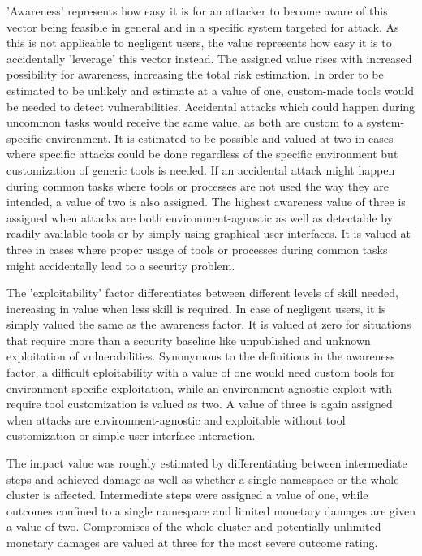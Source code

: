 'Awareness' represents how easy it is for an attacker to become aware of this vector being feasible in general and in a specific system targeted for attack. As this is not applicable to negligent users, the value represents how easy it is to accidentally 'leverage' this vector instead. The assigned value rises with increased possibility for awareness, increasing the total risk estimation.
In order to be estimated to be unlikely and estimate at a value of one, custom-made tools would be needed to detect vulnerabilities. Accidental attacks which could happen during uncommon tasks would receive the same value, as both are custom to a system-specific environment. It is estimated to be possible and valued at two in cases where specific attacks could be done regardless of the specific environment but customization of generic tools is needed. If an accidental attack might happen during common tasks where tools or processes are not used the way they are intended, a value of two is also assigned.
The highest awareness value of three is assigned when attacks are both environment-agnostic as well as detectable by readily available tools or by simply using graphical user interfaces. It is valued at three in cases where proper usage of tools or processes during common tasks might accidentally lead to a security problem.

\newpage
The 'exploitability' factor differentiates between different levels of skill needed, increasing in value when less skill is required. In case of negligent users, it is simply valued the same as the awareness factor. It is valued at zero for situations that require more than a security baseline like unpublished and unknown exploitation of vulnerabilities. Synonymous to the definitions in the awareness factor, a difficult eploitability with a value of one would need custom tools for environment-specific exploitation, while an environment-agnostic exploit with require tool customization is valued as two. A value of three is again assigned when attacks are environment-agnostic and exploitable without tool customization or simple user interface interaction.

The impact value was roughly estimated by differentiating between intermediate steps and achieved damage as well as whether a single namespace or the whole cluster is affected. Intermediate steps were assigned a value of one, while outcomes confined to a single namespace and limited monetary damages are given a value of two. Compromises of the whole cluster and potentially unlimited monetary damages are valued at three for the most severe outcome rating.

